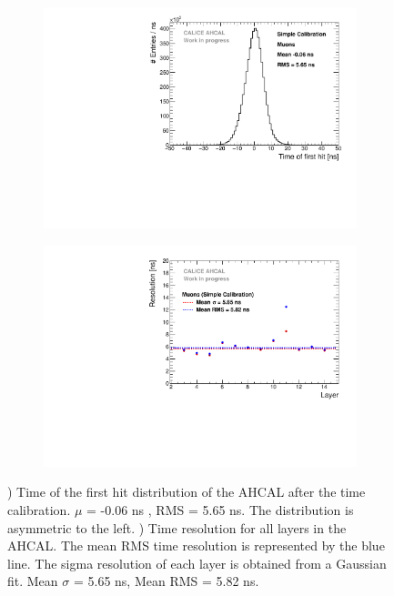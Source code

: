 \begin{figure}[htbp!]
	\begin{subfigure}[t]{0.5\textwidth}
		\centering
		\includegraphics[width=1\textwidth]{../Thesis_Plots/Timing/Muons/Plots/Timing_AHCAL_noCorrections.pdf}
		\caption{}\label{fig:timing_nocorrection}
	\end{subfigure}
	\hfill
	\begin{subfigure}[t]{0.5\textwidth}
		\centering
		\includegraphics[width=1\textwidth]{../Thesis_Plots/Timing/Muons/Plots/ResolutionPerModule_noCorrections.pdf}
		\caption{}\label{fig:reso_nocorrection}
	\end{subfigure}
	\caption{) Time of the first hit distribution of the AHCAL after the time calibration. $\mu$ = -0.06 ns , RMS = 5.65 ns. The distribution is asymmetric to the left. ) Time resolution for all layers in the AHCAL. The mean RMS time resolution is represented by the blue line. The sigma resolution of each layer is obtained from a Gaussian fit. Mean $\sigma$ = 5.65 ns, Mean RMS = 5.82 ns.}
\end{figure}

